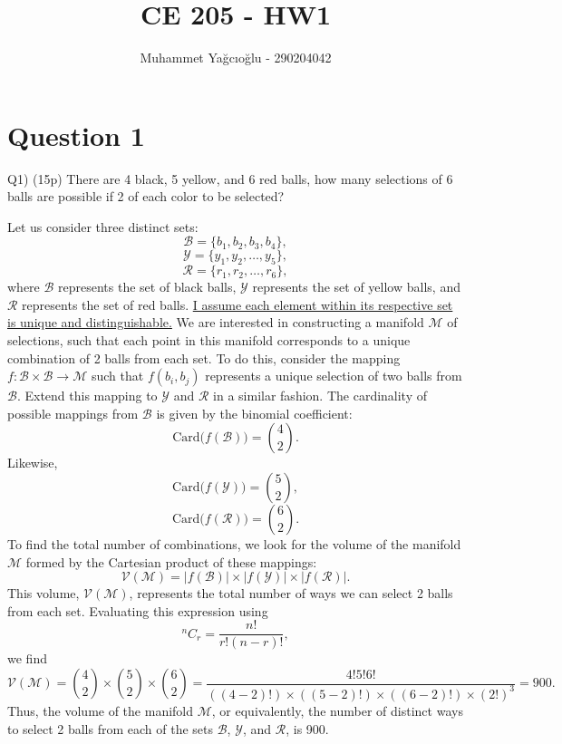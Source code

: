 \documentclass[12pt]{article}
\title{\vspace{-1cm}CE 205 - HW1}
\author{Muhammet Yağcıoğlu - 290204042}
\begin{document}
\maketitle\thispagestyle{fancy}
\pagestyle{fancy}
\tableofcontents

\newpage
\section*{Question 1}
\begin{q}
Q1) (15p) There are 4 black, 5 yellow, and 6 red balls, how many selections of 6 balls are possible if 2 of each color to be selected?
\end{q}
Let us consider three distinct sets: \[ \mathcal{B} = \{b_1, b_2, b_3, b_4\},\] \[ \mathcal{Y} = \{y_1, y_2, \ldots, y_5\}, \] \[ \mathcal{R} = \{r_1, r_2, \ldots, r_6\}, \] where \(\mathcal{B}\) represents the set of black balls, \(\mathcal{Y}\) represents the set of yellow balls, and \(\mathcal{R}\) represents the set of red balls. \underline{I assume each element within its respective set is unique and distinguishable.} We are interested in constructing a manifold \(\mathcal{M}\) of selections, such that each point in this manifold corresponds to a unique combination of 2 balls from each set.  To do this, consider the mapping \(f: \mathcal{B} \times \mathcal{B} \to \mathcal{M}\) such that \(f(b_i, b_j)\) represents a unique selection of two balls from \(\mathcal{B}\). Extend this mapping to \(\mathcal{Y}\) and \(\mathcal{R}\) in a similar fashion.  The cardinality of possible mappings from \(\mathcal{B}\) is given by the binomial coefficient: \[ \text{Card} \big(f(\mathcal{B})\big) = \binom{4}{2}. \] Likewise, \[ \text{Card} \big(f(\mathcal{Y})\big) = \binom{5}{2},\] \[ \text{Card} \big(f(\mathcal{R})\big) = \binom{6}{2}. \] To find the total number of combinations, we look for the volume of the manifold \(\mathcal{M}\) formed by the Cartesian product of these mappings: \[ \mathcal{V}(\mathcal{M}) = |f(\mathcal{B})| \times |f(\mathcal{Y})| \times |f(\mathcal{R})|. \] This volume, \(\mathcal{V}(\mathcal{M})\), represents the total number of ways we can select 2 balls from each set. Evaluating this expression using \[ ^nC_r = \frac{n!}{r!(n-r)!}, \] we find \[ \mathcal{V}(\mathcal{M}) = \binom{4}{2} \times \binom{5}{2} \times \binom{6}{2} = \frac{4! 5! 6!}{((4-2)!) \times ((5-2)!) \times ((6-2)!) \times (2!)^3} = 900. \] Thus, the volume of the manifold \(\mathcal{M}\), or equivalently, the number of distinct ways to select 2 balls from each of the sets \(\mathcal{B}\), \(\mathcal{Y}\), and \(\mathcal{R}\), is 900. \AnswerTag
\end{document}
